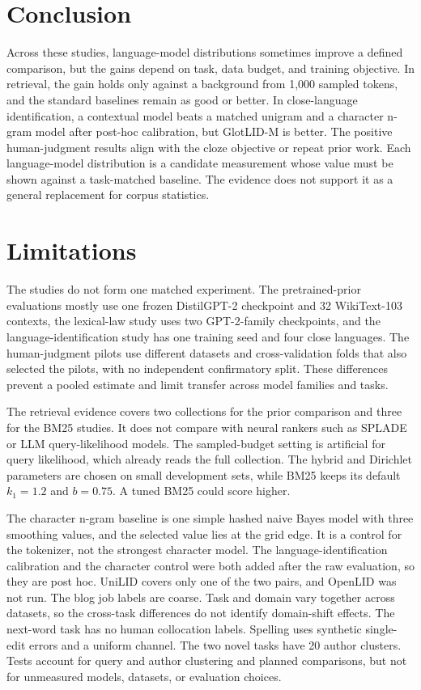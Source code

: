 \documentclass[11pt]{article}
\begin{document}
\section{Conclusion}

Across these studies, language-model distributions sometimes improve a defined
comparison, but the gains depend on task, data budget, and training objective.
In retrieval, the gain holds only against a background from 1,000 sampled
tokens, and the standard baselines remain as good or better. In close-language
identification, a contextual model beats a matched unigram and a character
n-gram model after post-hoc calibration, but GlotLID-M is better. The positive human-judgment results
align with the cloze objective or repeat prior work. Each language-model distribution
is a candidate measurement whose value must be shown against a task-matched
baseline. The evidence does not support it as a general replacement for corpus
statistics.

\section{Limitations}

The studies do not form one matched experiment. The pretrained-prior
evaluations mostly use one frozen DistilGPT-2 checkpoint and 32 WikiText-103
contexts, the lexical-law study uses two GPT-2-family checkpoints, and the
language-identification study
has one training seed and four close languages. The human-judgment pilots use
different datasets and cross-validation folds that also selected the pilots,
with no independent confirmatory split. These differences prevent a pooled
estimate and limit transfer across model families and tasks.

The retrieval evidence covers two collections for the prior comparison and
three for the BM25 studies. It does not compare with neural rankers such as
SPLADE or LLM query-likelihood models. The sampled-budget setting is artificial
for query likelihood, which already reads the full collection. The hybrid and
Dirichlet parameters are chosen on small development sets, while BM25 keeps
its default $k_1=1.2$ and $b=0.75$. A tuned BM25 could score higher.

The character n-gram baseline is one simple hashed naive Bayes model with
three smoothing values, and the selected value lies at the grid edge. It is a
control for the tokenizer, not the strongest character model. The
language-identification calibration and the character control were both added
after the raw evaluation, so they are post hoc. UniLID covers only one of the
two pairs, and OpenLID was not run. The blog job
labels are coarse. Task and domain vary together across datasets, so the
cross-task differences do not identify domain-shift effects. The next-word
task has no human collocation labels. Spelling uses synthetic single-edit
errors and a uniform channel. The two novel tasks have 20 author clusters.
Tests account for query and author clustering and planned comparisons, but not
for unmeasured models, datasets, or evaluation choices.


\end{document}
